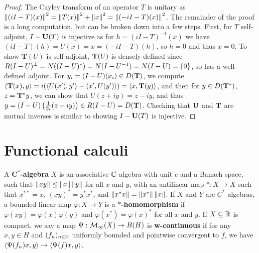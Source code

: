 \documentclass[10pt]{amsart}
\begin{document}
\begin{proof}
    The Cayley transform of an operator $T$ is unitary as $\left\| (iI - T)(x) \right\|^2 = \left\| T(x) \right\|^2 + \left\| x \right\|^2 = \left\| (-iI - T)(x) \right\|^2$. The remainder of the proof is a long computation, but can be broken down into a few steps. First, for $T$ self-adjoint, $I - \mathbf{U}(T)$ is injective as for $h = (iI - T)^{-1}(x)$ we have $(iI - T)(h) = U(x) = x = (-iI - T)(h)$, so $h = 0$ and thus $x = 0$. To show $\mathbf T(U)$ is self-adjoint, $\mathbf{T}(U)$ is densely defined since $R(I - U)^\perp = N((I - U)^*) = N(I - U^{-1}) = N(I - U) = \left\{  0  \right\}$, so has a well-defined adjoint. For $y_i = (I - U)(x_i) \in D(\mathbf{T})$, we compute $\left\langle \mathbf T(x), y \right\rangle = i(\left\langle U(x'), y' \right\rangle - \left\langle x', U(y') \right\rangle) = \left\langle x, \mathbf T(y) \right\rangle$, and then for $y \in D(\mathbf{T}^*)$, $z = \mathbf{T}^*y$, we can show that $U(z + iy) = z - iy$, and thus $y = (I - U)\left(  \frac1{2i}(z + iy)  \right) \in R(I - U) = D(\mathbf{T})$. Checking that $\mathbf{U}$ and $\mathbf{T}$ are mutual inverses is similar to showing $I - \mathbf{U}(T)$ is injective.
\end{proof}


\section{Functional calculi}
A \textbf{$\mathbf{C^*}$-algebra} $X$ is an associative $\mathbb{C}$-algebra with unit $e$ and a Banach space, such that $\left\| xy \right\| \leq \left\| x \right\|\left\| y \right\|$ for all $x$ and $y$, with an antilinear map $* : X \to X$ such that $x^{**} = x$, $(xy)^* = y^*x^*$, and $\left\| x^*x \right\| = \left\| x^* \right\|\left\| x \right\|$. If $X$ and $Y$ are $C^*$-algebras, a bounded linear map $\varphi : X \to Y$ is a \textbf{$\mathbf{*}$-homomorphism} if $\varphi(xy) = \varphi(x)\varphi(y)$ and $\varphi(x^*) = \varphi(x)^*$ for all $x$ and $y$. %
If $X \subseteq \mathbb{R}$ is compact, we say a map $\Psi : \mathcal{M}_\infty(X) \to B(H)$ is \textbf{w-continuous} if for any $x, y \in H$ and $(f_n)_{n \in \mathbb{N}}$ uniformly bounded and pointwise convergent to $f$, we have $\left\langle \Psi(f_n)x, y \right\rangle \to \left\langle \Psi(f)x, y \right\rangle$.
\end{document}
